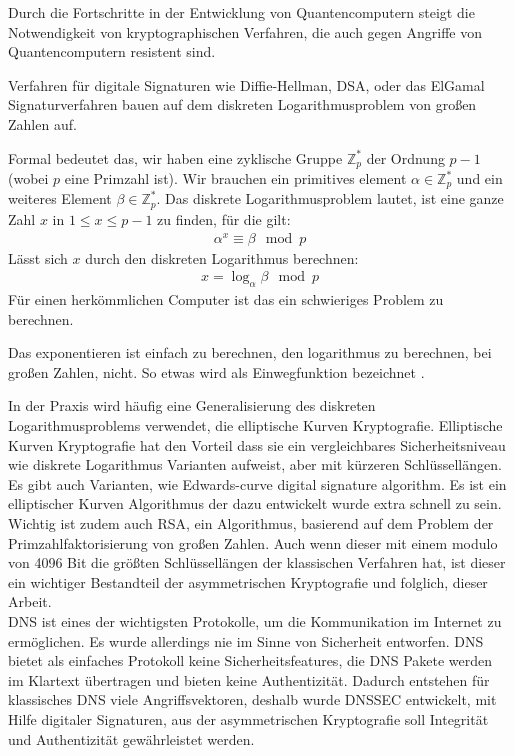 Durch die Fortschritte in der Entwicklung von Quantencomputern steigt die Notwendigkeit von kryptographischen Verfahren,
die auch gegen Angriffe von Quantencomputern resistent sind.

Verfahren für digitale Signaturen wie Diffie-Hellman, DSA, oder das ElGamal Signaturverfahren bauen auf dem diskreten Logarithmusproblem von großen Zahlen auf.

Formal bedeutet das, wir haben eine zyklische Gruppe $\mathbb{Z}^*_p$ der Ordnung $p-1$ (wobei $p$ eine Primzahl ist).
Wir brauchen ein primitives element $\alpha \in \mathbb{Z}^*_p$ und ein weiteres Element $\beta \in \mathbb{Z}^*_p$.
Das diskrete Logarithmusproblem lautet, ist eine ganze Zahl $x$ in $1 \le x \le p-1$ zu finden, für die gilt:
\begin{align}
    \alpha^x \equiv \beta \mod p
\end{align}
Lässt sich $x$ durch den diskreten Logarithmus berechnen:
\begin{align}
    x = \log_\alpha \beta \mod p
\end{align}
Für einen herkömmlichen Computer ist das ein schwieriges Problem zu berechnen.

Das exponentieren ist einfach zu berechnen, den logarithmus zu berechnen, bei großen Zahlen, nicht.
So etwas wird als Einwegfunktion bezeichnet \cite{paarKryptografieVerstaendlichLehrbuch2016}.

In der Praxis wird häufig eine Generalisierung des diskreten Logarithmusproblems verwendet, die elliptische Kurven Kryptografie.
Elliptische Kurven Kryptografie hat den Vorteil dass sie ein vergleichbares Sicherheitsniveau wie diskrete Logarithmus Varianten aufweist, aber mit kürzeren Schlüssellängen.
Es gibt auch Varianten, wie Edwards-curve digital signature algorithm. Es ist ein elliptischer Kurven Algorithmus der dazu entwickelt wurde extra schnell zu sein.
Wichtig ist zudem auch RSA, ein Algorithmus, basierend auf dem Problem der Primzahlfaktorisierung von großen Zahlen.
Auch wenn dieser mit einem modulo von 4096 Bit die größten Schlüssellängen der klassischen Verfahren hat, ist dieser ein wichtiger Bestandteil der asymmetrischen Kryptografie und folglich, dieser Arbeit.\\

DNS ist eines der wichtigsten Protokolle, um die Kommunikation im Internet zu ermöglichen.
Es wurde allerdings nie im Sinne von Sicherheit entworfen.
DNS bietet als einfaches Protokoll keine Sicherheitsfeatures, die DNS Pakete werden im Klartext übertragen und bieten keine Authentizität.
Dadurch entstehen für klassisches DNS viele Angriffsvektoren, deshalb wurde DNSSEC entwickelt, mit Hilfe digitaler Signaturen, aus der asymmetrischen Kryptografie soll Integrität und Authentizität gewährleistet werden.

